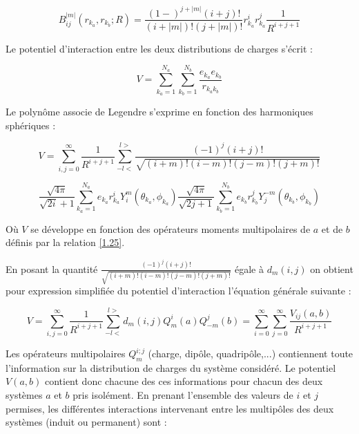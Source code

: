 	\begin{equation}
	B_{ij}^{|m|}(r_{k_{a}}, r_{k_{b}}; R) = \frac{(1-)^{j+|m|} (i+j)!}{(i+|m|)! (j+|m|)!} r^{i}_{k_{a}} r_{k_{a}}^{j} \frac{1}{R^{i+j+1}}
	\end{equation}
	
	Le potentiel d'interaction entre les deux distributions de charges s'écrit : 
	
	\begin{equation}
	V = \sum_{k_{a}=1}^{N_{a}} \sum_{k_{b}=1}^{N_{b}} \frac{e_{k_{a}}e_{k_{b}}}{r_{k_{a}k_{b}}}
	\end{equation}
	
	
	Le polynôme associe de Legendre s'exprime en fonction des harmoniques sphériques : 
	
	\begin{equation}
	V = \sum_{i,j=0}^{\infty} \frac{1}{R^{i+j+1}} \sum_{-l<}^{l>} \frac{(-1)^{j} (i+j)!} {\sqrt{(i+m)! (i-m)! (j-m)! (j+m)!}}
	\end{equation}
	
	\begin{equation}
	\frac{\sqrt{4\pi}}{\sqrt{2i}+ 1} \sum_{k_{a}=1}^{N_{a}} e_{k_{a}} r_{k_{a}}^{i} Y_{i}^{m} (\theta_{k_{a}},\phi_{k_{a}}) \frac{\sqrt{4\pi}}{\sqrt{2j+ 1}} \sum_{k_{b}=1}^{N_{b}} e_{k_{b}}r_{k_{b}}^{j} Y_{j}^{-m}(\theta_{k_{b}},\phi_{k_{b}})
	\end{equation}
	
	Où $V$ se développe en fonction des opérateurs moments multipolaires de $a$ et de $b$ définis par la relation \ref{1.25}.
	
	En posant la quantité $\frac{(-1)^{j} (i+j)!} {\sqrt{(i+m)! (i-m)! (j-m)! (j+m)!}}$ égale à $d_{m}(i,j)$ on obtient pour expression simplifiée du potentiel d'interaction l'équation générale suivante : 
	
	\begin{equation}
	V = \sum_{i,j=0}^{\infty} \frac{1}{R^{i+j+1}} \sum_{-l<}^{l>} d_{m}(i,j) Q_{m}^{i}(a) Q_{-m}^{j} (b) = \sum_{i=0}^{\infty} \sum_{j=0}^{\infty} \frac{V_{ij}(a,b)}{R^{i+j+1}} \label{1.33}
	\end{equation}
	
	Les opérateurs multipolaires $Q_{m}^{i;j}$ (charge, dipôle, quadripôle,...) contiennent toute l'information sur la distribution de charges du système considéré. Le potentiel $V(a,b)$ contient donc chacune des ces informations pour chacun des deux systèmes $a$ et $b$ pris isolément. En prenant l'ensemble des valeurs de $i$ et $j$ permises, les différentes interactions intervenant entre les multipôles des deux systèmes (induit ou permanent) sont :
	
